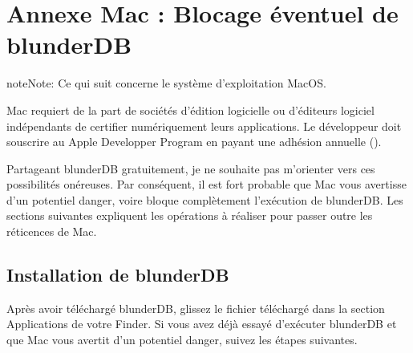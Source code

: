 \documentclass[letterpaper,10pt,french]{sphinxmanual}
\begin{document}
\begin{figure}[htbp]
\centering

\noindent{}
\end{figure}

\begin{figure}[htbp]
\centering

\noindent{}
\end{figure}

\begin{figure}[htbp]
\centering

\noindent{}
\end{figure}

\sphinxstepscope


\section{Annexe Mac : Blocage éventuel de blunderDB}
\label{\detokenize{annexe_mac_securite:annexe-mac-blocage-eventuel-de-blunderdb}}\label{\detokenize{annexe_mac_securite:annexe-mac-malware}}\label{\detokenize{annexe_mac_securite::doc}}
\begin{sphinxadmonition}{note}{Note:}
\sphinxAtStartPar
Ce qui suit concerne le système d’exploitation MacOS.
\end{sphinxadmonition}

\sphinxAtStartPar
Mac requiert de la part de sociétés d’édition logicielle ou
d’éditeurs logiciel indépendants de certifier numériquement leurs applications.
Le développeur doit souscrire au Apple Developper Program en payant une adhésion annuelle ().

\sphinxAtStartPar
Partageant blunderDB gratuitement, je ne souhaite pas m’orienter vers ces
possibilités onéreuses. Par conséquent, il est fort probable que Mac vous
avertisse d’un potentiel danger, voire bloque complètement l’exécution de
blunderDB. Les sections suivantes expliquent les opérations à réaliser pour
passer outre les réticences de Mac.


\subsection{Installation de blunderDB}
\label{\detokenize{annexe_mac_securite:installation-de-blunderdb}}
\sphinxAtStartPar
Après avoir téléchargé blunderDB, glissez le fichier téléchargé dans la section
Applications de votre Finder. Si vous avez déjà essayé d’exécuter blunderDB et
que Mac vous avertit d’un potentiel danger, suivez les étapes suivantes.
\end{document}
